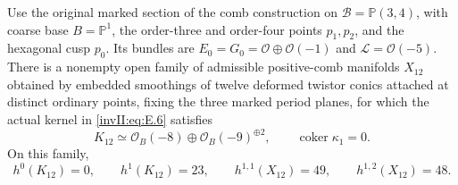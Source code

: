 \begin{proposition}\label{inv:E2.5}
Use the original marked section of the comb construction on
$\mathcal B=\mathbb P(3,4)$, with coarse base $B=\mathbb P^1$, the
order-three and order-four points $p_1,p_2$, and the hexagonal cusp $p_0$.
Its bundles are $E_0=G_0=\mathcal O\oplus\mathcal O(-1)$ and
$\mathcal L=\mathcal O(-5)$. There is a nonempty open family of
admissible positive-comb manifolds $X_{12}$ obtained by embedded
smoothings of twelve deformed twistor conics attached at distinct
ordinary points, fixing the three marked period planes, for which the
actual kernel in \eqref{invII:eq:E.6} satisfies
\[
 K_{12}\simeq\mathcal O_B(-8)\oplus\mathcal O_B(-9)^{\oplus2},
 \qquad \operatorname{coker}\kappa_1=0.
\]
On this family,
\[
 h^0(K_{12})=0,\qquad h^1(K_{12})=23,\qquad
 h^{1,1}(X_{12})=49,\qquad h^{1,2}(X_{12})=48.
\]
\end{proposition}

